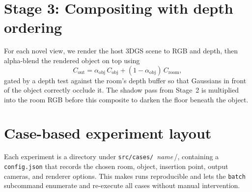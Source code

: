 \section{Stage 3: Compositing with depth ordering}

For each novel view, we render the host 3DGS scene to RGB and depth, then
alpha-blend the rendered object on top using
\[
  C_{\text{out}} = \alpha_{\text{obj}}\, C_{\text{obj}} +
                   (1-\alpha_{\text{obj}})\, C_{\text{room}},
\]
gated by a depth test against the room's depth buffer so that Gaussians in
front of the object correctly occlude it. The shadow pass from Stage~2 is
multiplied into the room RGB before this composite to darken the floor
beneath the object.

\section{Case-based experiment layout}

Each experiment is a directory under \texttt{src/cases/}\,
\textit{name}\,/, containing a \texttt{config.json} that records the chosen
room, object, insertion point, output cameras, and renderer options. This
makes runs reproducible and lets the \texttt{batch} subcommand enumerate
and re-execute all cases without manual intervention.
